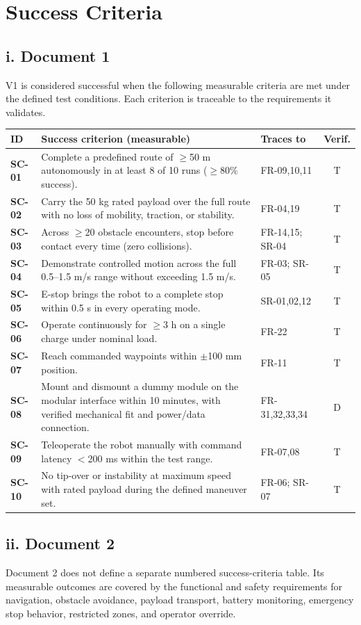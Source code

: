 \chapter{Success Criteria}

\section*{i. Document 1}

V1 is considered successful when the following measurable criteria are met under the defined test conditions. Each criterion is traceable to the requirements it validates.

\begin{table}[H]
\centering
\begin{tabularx}{\textwidth}{>{\bfseries}L{0.12\textwidth}Y L{0.18\textwidth}c}
\toprule
ID & Success criterion (measurable) & Traces to & Verif. \\
\midrule
SC-01 & Complete a predefined route of $\geq$50 m autonomously in at least 8 of 10 runs ($\geq$80\% success). & FR-09,10,11 & T \\
SC-02 & Carry the 50 kg rated payload over the full route with no loss of mobility, traction, or stability. & FR-04,19 & T \\
SC-03 & Across $\geq$20 obstacle encounters, stop before contact every time (zero collisions). & FR-14,15; SR-04 & T \\
SC-04 & Demonstrate controlled motion across the full 0.5--1.5 m/s range without exceeding 1.5 m/s. & FR-03; SR-05 & T \\
SC-05 & E-stop brings the robot to a complete stop within 0.5 s in every operating mode. & SR-01,02,12 & T \\
SC-06 & Operate continuously for $\geq$3 h on a single charge under nominal load. & FR-22 & T \\
SC-07 & Reach commanded waypoints within $\pm$100 mm position. & FR-11 & T \\
SC-08 & Mount and dismount a dummy module on the modular interface within 10 minutes, with verified mechanical fit and power/data connection. & FR-31,32,33,34 & D \\
SC-09 & Teleoperate the robot manually with command latency $<$200 ms within the test range. & FR-07,08 & T \\
SC-10 & No tip-over or instability at maximum speed with rated payload during the defined maneuver set. & FR-06; SR-07 & T \\
\bottomrule
\end{tabularx}
\end{table}

\section*{ii. Document 2}

Document 2 does not define a separate numbered success-criteria table. Its measurable outcomes are covered by the functional and safety requirements for navigation, obstacle avoidance, payload transport, battery monitoring, emergency stop behavior, restricted zones, and operator override.
